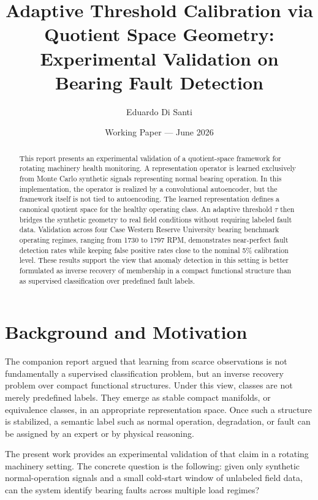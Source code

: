 \documentclass[11pt]{article}
\title{Adaptive Threshold Calibration via Quotient Space Geometry:\\
Experimental Validation on Bearing Fault Detection}
\author{Eduardo Di Santi}
\affil{College of Engineering and Applied Science\\
University of Colorado Boulder}
\date{Working Paper --- June 2026}
\begin{document}
\maketitle

\begin{abstract}
This report presents an experimental validation of a quotient-space framework for rotating machinery health monitoring. A representation operator is learned exclusively from Monte Carlo synthetic signals representing normal bearing operation. In this implementation, the operator is realized by a convolutional autoencoder, but the framework itself is not tied to autoencoding. The learned representation defines a canonical quotient space for the healthy operating class. An adaptive threshold $\tau$ then bridges the synthetic geometry to real field conditions without requiring labeled fault data. Validation across four Case Western Reserve University bearing benchmark operating regimes, ranging from 1730 to 1797 RPM, demonstrates near-perfect fault detection rates while keeping false positive rates close to the nominal 5\% calibration level. These results support the view that anomaly detection in this setting is better formulated as inverse recovery of membership in a compact functional structure than as supervised classification over predefined fault labels.
\end{abstract}

\section{Background and Motivation}

The companion report \cite{disanti2026selfsupervision} argued that learning from scarce observations is not fundamentally a supervised classification problem, but an inverse recovery problem over compact functional structures. Under this view, classes are not merely predefined labels. They emerge as stable compact manifolds, or equivalence classes, in an appropriate representation space. Once such a structure is stabilized, a semantic label such as normal operation, degradation, or fault can be assigned by an expert or by physical reasoning.

The present work provides an experimental validation of that claim in a rotating machinery setting. The concrete question is the following: given only synthetic normal-operation signals and a small cold-start window of unlabeled field data, can the system identify bearing faults across multiple load regimes?
\end{document}
